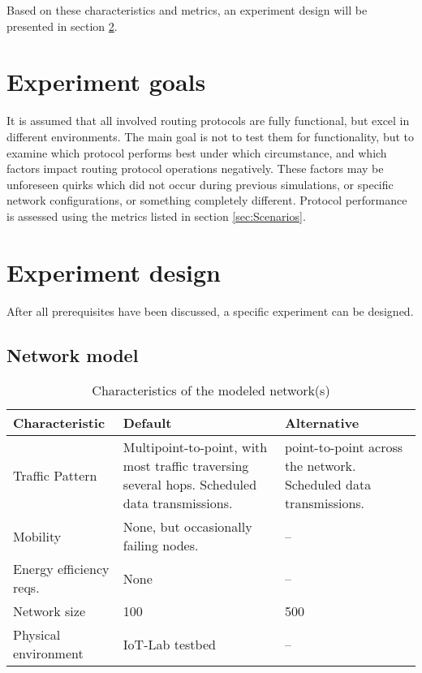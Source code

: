 \documentclass{acm_proc_article-sp}
\begin{document}
Based on these characteristics and metrics, an experiment design will be presented in section \ref{sec:Design}.


\section{Experiment goals}
\label{sec:Goals}
It is assumed that all involved routing protocols are fully functional, but excel in different environments. The main goal is not to test them for functionality, but to examine which protocol performs best under which circumstance, and which factors impact routing protocol operations negatively. These factors may be unforeseen quirks which did not occur during previous simulations, or specific network configurations, or something completely different. Protocol performance is assessed using the metrics listed in section \ref{sec:Scenarios}.

\section{Experiment design}
\label{sec:Design}
After all prerequisites have been discussed, a specific experiment can be designed.

\subsection{Network model}
\label{subsec:Model}

\begin{table*}[t]
    \begin{tabularx}{\textwidth}{l | X | X  }
      Characteristic & Default & Alternative \\
      \hline
      Traffic Pattern & Multipoint-to-point, with most traffic traversing several hops. Scheduled data transmissions. & point-to-point across the network. Scheduled data transmissions. \\
      Mobility & None, but occasionally failing nodes. & -- \\
      Energy efficiency reqs. & None & --\\
      Network size & 100 & 500\\
      Physical environment & IoT-Lab testbed & -- \\
    \end{tabularx}
    \caption{Characteristics of the modeled network(s)}
    \label{fig:characteristics}
\end{table*}
\end{document}
